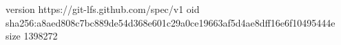 version https://git-lfs.github.com/spec/v1
oid sha256:a8aed808c7bc889de54d368e601c29a0ce19663af5d4ae8dff16e6f10495444e
size 1398272
